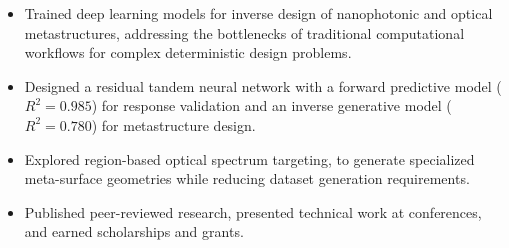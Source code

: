 \documentclass[letter,9pt]{article}
\begin{document}
    \begin{itemize}[noitemsep, topsep=0pt]
        \item Trained deep learning models for inverse design of nanophotonic and optical metastructures, addressing the bottlenecks of traditional computational workflows for complex deterministic design problems.
        \item Designed a residual tandem neural network with a forward predictive model ($R^2=0.985$) for response validation and an inverse generative model ($R^2=0.780$) for metastructure design.
        \item Explored region-based optical spectrum targeting, to generate specialized meta-surface geometries while reducing dataset generation requirements. 
        \item Published peer-reviewed research, presented technical work at conferences, and earned scholarships and grants.
    \end{itemize}
\end{document}
